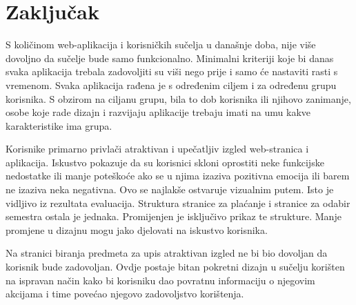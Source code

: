 \documentclass[times, utf8, zavrsni, numeric]{fer}
\begin{document}
     
    
    


\chapter{Zaključak}



S količinom web-aplikacija i korisničkih sučelja u današnje doba, nije više dovoljno da sučelje bude samo funkcionalno. Minimalni kriteriji koje bi danas svaka aplikacija trebala zadovoljiti su viši nego prije i samo će nastaviti rasti s vremenom. Svaka aplikacija rađena je s određenim ciljem i za određenu grupu korisnika. S obzirom na ciljanu grupu, bila to dob korisnika ili njihovo zanimanje, osobe koje rade dizajn i razvijaju aplikacije trebaju imati na umu kakve karakteristike ima grupa.

Korisnike primarno privlači atraktivan i upečatljiv izgled web-stranica i aplikacija. Iskustvo pokazuje da su korisnici skloni oprostiti neke funkcijske nedostatke ili manje poteškoće ako se u njima izaziva pozitivna emocija ili barem ne izaziva neka negativna. Ovo se najlakše ostvaruje vizualnim putem. Isto je vidljivo iz rezultata evaluacija. Struktura stranice za plaćanje i stranice za odabir semestra ostala je jednaka. Promijenjen je isključivo prikaz te strukture. Manje promjene u dizajnu mogu jako djelovati na iskustvo korisnika.

Na stranici biranja predmeta za upis atraktivan izgled ne bi bio dovoljan da korisnik bude zadovoljan. Ovdje postaje bitan pokretni dizajn u sučelju korišten na ispravan način kako bi korisniku dao povratnu informaciju o njegovim
akcijama i time povećao njegovo zadovoljstvo korištenja.



\nocite{*}


\end{document}
